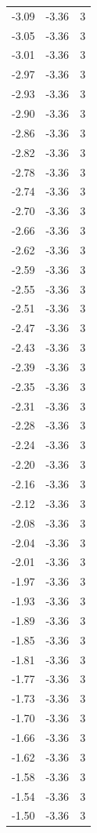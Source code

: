 \begin{longtable}{lrr}
  -3.09 & -3.36 & 3 \\
  -3.05 & -3.36 & 3 \\
  -3.01 & -3.36 & 3 \\
  -2.97 & -3.36 & 3 \\
  -2.93 & -3.36 & 3 \\
  -2.90 & -3.36 & 3 \\
  -2.86 & -3.36 & 3 \\
  -2.82 & -3.36 & 3 \\
  -2.78 & -3.36 & 3 \\
  -2.74 & -3.36 & 3 \\
  -2.70 & -3.36 & 3 \\
  -2.66 & -3.36 & 3 \\
  -2.62 & -3.36 & 3 \\
  -2.59 & -3.36 & 3 \\
  -2.55 & -3.36 & 3 \\
  -2.51 & -3.36 & 3 \\
  -2.47 & -3.36 & 3 \\
  -2.43 & -3.36 & 3 \\
  -2.39 & -3.36 & 3 \\
  -2.35 & -3.36 & 3 \\
  -2.31 & -3.36 & 3 \\
  -2.28 & -3.36 & 3 \\
  -2.24 & -3.36 & 3 \\
  -2.20 & -3.36 & 3 \\
  -2.16 & -3.36 & 3 \\
  -2.12 & -3.36 & 3 \\
  -2.08 & -3.36 & 3 \\
  -2.04 & -3.36 & 3 \\
  -2.01 & -3.36 & 3 \\
  -1.97 & -3.36 & 3 \\
  -1.93 & -3.36 & 3 \\
  -1.89 & -3.36 & 3 \\
  -1.85 & -3.36 & 3 \\
  -1.81 & -3.36 & 3 \\
  -1.77 & -3.36 & 3 \\
  -1.73 & -3.36 & 3 \\
  -1.70 & -3.36 & 3 \\
  -1.66 & -3.36 & 3 \\
  -1.62 & -3.36 & 3 \\
  -1.58 & -3.36 & 3 \\
  -1.54 & -3.36 & 3 \\
  -1.50 & -3.36 & 3 \\

\end{longtable}
